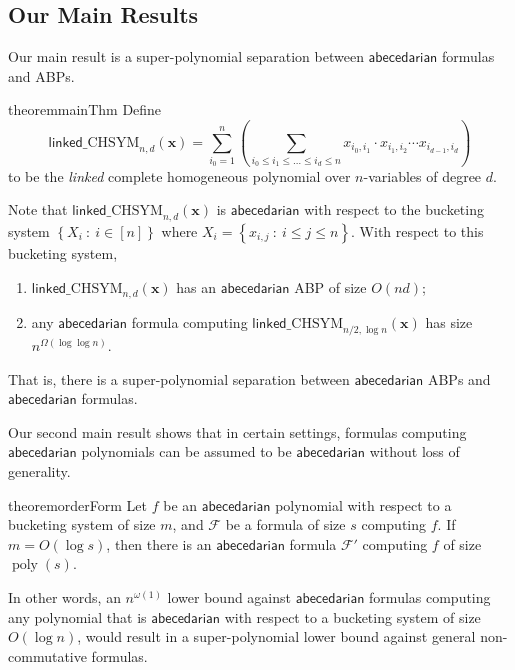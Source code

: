 \documentclass[10pt,a4paper]{article}
\def\poly{\operatorname{poly}}
\def\inparen#1{\left( #1 \right)}
\def\inbrace#1{\left\{ #1 \right\}}
\def\setdef#1#2{\inbrace{ #1 \ : \ #2}}
\def\vecx{\mathbf{x}}
\newcommand{\form}{\textbf{$\mathcal{F}$}}
\newcommand{\abcd}{\mathsf{abecedarian}}
\newcommand{\lchsym}[2]{\mathrm{\mathsf{linked}\_CHSYM}_{#1,#2}}
\begin{document}
\subsection{Our Main Results}

Our main result is a super-polynomial separation between $\abcd$ formulas and ABPs.


\begin{restatable}{theorem}{mainThm}\label{thm:main}
	Define 
	\[
		\lchsym{n}{d}(\vecx) = \sum_{i_0=1}^{n} \inparen{\sum_{i_0 \leq i_1 \leq \ldots \leq i_d \leq n} x_{i_0, i_1} \cdot x_{i_1,i_2} \cdots x_{i_{d-1}, i_d}}
	\]
	to be the \emph{linked} complete homogeneous polynomial over $n$-variables of degree $d$.

	Note that $\lchsym{n}{d}(\vecx)$ is $\abcd$ with respect to the bucketing system $\setdef{X_i}{i \in [n]}$ where $X_i = \setdef{x_{i,j}}{i \leq j \leq n}$. With respect to this bucketing system,  
	\begin{enumerate}
		\item $\lchsym{n}{d}(\vecx)$ has an $\abcd$ ABP of size $O(nd)$;
		
		\item any $\abcd$ formula computing $\lchsym{n/2}{\log n}(\vecx)$ has size $n^{\Omega(\log \log n)}$.
	\end{enumerate}
	That is, there is a super-polynomial separation between $\abcd$ ABPs and $\abcd$ formulas.
\end{restatable}


Our second main result shows that in certain settings, formulas computing $\abcd$ polynomials can be assumed to be $\abcd$ without loss of generality.

\begin{restatable}{theorem}{orderForm}\label{thm:orderForm}
	Let $f$ be an $\abcd$ polynomial with respect to a bucketing system of size $m$, and $\form$ be a formula of size $s$ computing $f$.
	If $m = O(\log s)$, then there is an $\abcd$ formula  $\form'$ computing $f$ of size $\poly(s)$.
\end{restatable}

\noindent In other words, an $n^{\omega(1)}$ lower bound against $\abcd$ formulas computing any polynomial that is $\abcd$ with respect to a bucketing system of size $O(\log n)$, would result in a super-polynomial lower bound against general non-commutative formulas.\\
\end{document}
